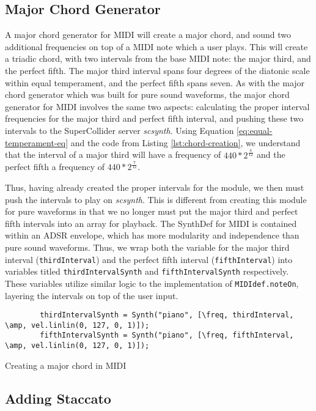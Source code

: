 \subsection{Major Chord Generator}

A major chord generator for MIDI will create a major chord, and sound two additional frequencies on top of a MIDI note which a user plays. This will create a triadic chord, with two intervals from the base MIDI note: the major third, and the perfect fifth. The major third interval spans four degrees of the diatonic scale within equal temperament, and the perfect fifth spans seven. As with the major chord generator which was built for pure sound waveforms, the major chord generator for MIDI involves the same two aspects: calculating the proper interval frequencies for the major third and perfect fifth interval, and pushing these two intervals to the SuperCollider server \textit{scsynth}. Using Equation \ref{eq:equal-temperament-eq} and the code from Listing \ref{lst:chord-creation}, we understand that the interval of a major third will have a frequency of $440 * 2^\frac{4}{12}$ and the perfect fifth a frequency of $440 * 2^\frac{7}{12}$.

Thus, having already created the proper intervals for the module, we then must push the intervals to play on \textit{scsynth}. This is different from creating this module for pure waveforms in that we no longer must put the major third and perfect fifth intervals into an array for playback. The SynthDef for MIDI is contained within an ADSR envelope, which has more modularity and independence than pure sound waveforms. Thus, we wrap both the variable for the major third interval (\texttt{thirdInterval}) and the perfect fifth interval (\texttt{fifthInterval}) into variables titled \texttt{thirdIntervalSynth} and \texttt{fifthIntervalSynth} respectively. These variables utilize similar logic to the implementation of \texttt{MIDIdef.noteOn}, layering the intervals on top of the user input.

\begin{listing}
	\begin{lstlisting}
		thirdIntervalSynth = Synth("piano", [\freq, thirdInterval, \amp, vel.linlin(0, 127, 0, 1)]);
		fifthIntervalSynth = Synth("piano", [\freq, fifthInterval, \amp, vel.linlin(0, 127, 0, 1)]);
	\end{lstlisting}
	\label{lst:midi-maj-chord}
	\caption{Creating a major chord in MIDI}
\end{listing}

\subsection{Adding Staccato}

